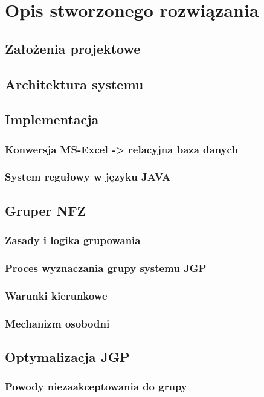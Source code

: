 \chapter{Opis stworzonego rozwiązania}
\label{cha:rozwiazanie}

\section{Założenia projektowe}
\label{sec:zalozeniaProjektowe}

\section{Architektura systemu}
\label{sec:architekturaSystemu}

\section{Implementacja}
\label{sec:architekturaSystemu}

\subsection{Konwersja MS-Excel -> relacyjna baza danych}
\label{sec:konwersjaExcelDB}

\subsection{System regułowy w języku JAVA}
\label{sec:systemRegulowyJAVA}

\section{Gruper NFZ}
\label{sec:gruperNFZ}

\subsection{Zasady i logika grupowania}
\label{sec:zasadyLogikaGrupowania}

\subsection{Proces wyznaczania grupy systemu JGP}
\label{sec:procesWyznaczaniaGrupySystemuJGP}

\subsection{Warunki kierunkowe}
\label{sec:warunkiKierunkowe}

\subsection{Mechanizm osobodni}
\label{sec:mechanizmOsobodni}

\section{Optymalizacja JGP}
\label{sec:optymalizacjaJGP}

\subsection{Powody niezaakceptowania do grupy}
\label{sec:powodyNiezaakceptowaniaDoGrupy}
